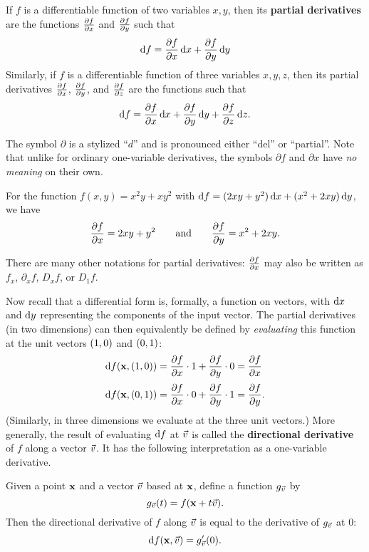 \documentclass[12pt]{amsart}
\begin{document}
\begin{defn}
  If $f$ is a differentiable function of two variables $x,y$, then its \textbf{partial derivatives} are the functions $\frac{\partial f}{\partial x}$ and $\frac{\partial f}{\partial y}$ such that
  \[ \mathrm{d} f = \frac{\partial f}{\partial x}\,\mathrm{d} x + \frac{\partial f}{\partial y}\,\mathrm{d} y\]
  Similarly, if $f$ is a differentiable function of three variables $x,y,z$, then its partial derivatives $\frac{\partial f}{\partial x}$, $\frac{\partial f}{\partial y}$, and $\frac{\partial f}{\partial z}$ are the functions such that
  \[ \mathrm{d} f = \frac{\partial f}{\partial x}\,\mathrm{d} x + \frac{\partial f}{\partial y}\,\mathrm{d} y + \frac{\partial f}{\partial z}\,\mathrm{d} z.\]
\end{defn}

The symbol $\partial$ is a stylized ``$d$'' and is pronounced either ``del'' or ``partial''.
Note that unlike for ordinary one-variable derivatives, the symbols $\partial f$ and $\partial x$ have \emph{no meaning} on their own.

\begin{eg}
  For the function $f(x,y) = x^2y + xy^2$ with $\mathrm{d} f = (2xy + y^2)\,\mathrm{d} x + (x^2+2xy)\,\mathrm{d} y$, we have
  \begin{align*}
    \frac{\partial f}{\partial x} = 2xy + y^2 \qquad\text{and}\qquad
    \frac{\partial f}{\partial y} = x^2+2xy.
  \end{align*}
\end{eg}

There are many other notations for partial derivatives: $\frac{\partial f}{\partial x}$ may also be written as $f_x$, $\partial_x f$, $D_x f$, or $D_1 f$.

Now recall that a differential form is, formally, a function on vectors, with $\mathrm{d} x$ and $\mathrm{d} y$ representing the components of the input vector.
The partial derivatives (in two dimensions) can then equivalently be defined by \emph{evaluating} this function at the unit vectors $(1,0)$ and $(0,1)$:
\begin{align*}
  \mathrm{d} f(\mathbf{x},(1,0)) &= \frac{\partial f}{\partial x}\cdot 1 + \frac{\partial f}{\partial y}\cdot 0 = \frac{\partial f}{\partial x}\\[2pt]
  \mathrm{d} f(\mathbf{x},(0,1)) &= \frac{\partial f}{\partial x}\cdot 0 + \frac{\partial f}{\partial y}\cdot 1 = \frac{\partial f}{\partial y}.
\end{align*}
(Similarly, in three dimensions we evaluate at the three unit vectors.)
More generally, the result of evaluating $\mathrm{d} f$ at $\vec{v}$ is called the \textbf{directional derivative} of $f$ along a vector $\vec{v}$.
It has the following interpretation as a one-variable derivative.

\begin{thm}
  Given a point $\mathbf{x}$ and a vector $\vec{v}$ based at $\mathbf{x}$, define a function $g_{\vec{v}}$ by
  \[ g_{\vec{v}}(t) = f(\mathbf{x} + t \vec{v}). \]
  Then the directional derivative of $f$ along $\vec{v}$ is equal to the derivative of $g_{\vec{v}}$ at $0$:
  \[ \mathrm{d} f(\mathbf{x},\vec{v}) = g_{\vec{v}}'(0). \]
\end{thm}
\end{document}
